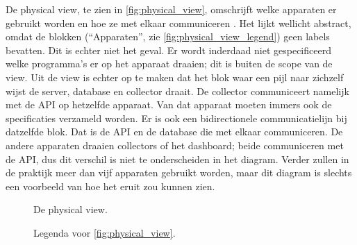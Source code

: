 \documentclass[../views.tex]{subfiles}
\begin{document}
De physical view, te zien in \autoref{fig:physical_view}, omschrijft welke apparaten er gebruikt worden en hoe ze met elkaar communiceren \parencite{architectural_blueprints}. Het lijkt wellicht abstract, omdat de blokken (``Apparaten'', zie \autoref{fig:physical_view_legend}) geen labels bevatten. Dit is echter niet het geval. Er wordt inderdaad niet gespecificeerd welke programma's er op het apparaat draaien; dit is buiten de scope van de view. Uit de view is echter op te maken dat het blok waar een pijl naar zichzelf wijst de server, database en collector draait. De collector communiceert namelijk met de API op hetzelfde apparaat. Van dat apparaat moeten immers ook de specificaties verzameld worden. Er is ook een bidirectionele communicatielijn bij datzelfde blok. Dat is de API en de database die met elkaar communiceren. De andere apparaten draaien collectors of het dashboard; beide communiceren met de API, dus dit verschil is niet te onderscheiden in het diagram. Verder zullen in de praktijk meer dan vijf apparaten gebruikt worden, maar dit diagram is slechts een voorbeeld van hoe het eruit zou kunnen zien.

\begin{figure}[ht]
  \centering
  \caption{De physical view.}
  \label{fig:physical_view}
\end{figure}

\begin{figure}[ht]
  \centering
  \caption{Legenda voor \autoref{fig:physical_view}.}
  \label{fig:physical_view_legend}
\end{figure}
\end{document}
